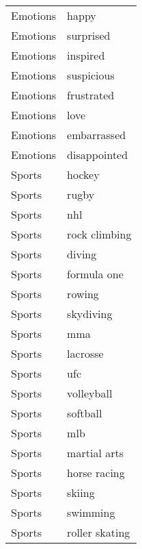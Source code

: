 \begin{supertabular}{l p{0.25\textwidth}}
         Emotions &                              happy \\
         Emotions &                          surprised \\
         Emotions &                           inspired \\
         Emotions &                         suspicious \\
         Emotions &                         frustrated \\
         Emotions &                               love \\
         Emotions &                        embarrassed \\
         Emotions &                       disappointed \\
           Sports &                             hockey \\
           Sports &                              rugby \\
           Sports &                                nhl \\
           Sports &                      rock climbing \\
           Sports &                             diving \\
           Sports &                        formula one \\
           Sports &                             rowing \\
           Sports &                          skydiving \\
           Sports &                                mma \\
           Sports &                           lacrosse \\
           Sports &                                ufc \\
           Sports &                         volleyball \\
           Sports &                           softball \\
           Sports &                                mlb \\
           Sports &                       martial arts \\
           Sports &                       horse racing \\
           Sports &                             skiing \\
           Sports &                           swimming \\
           Sports &                     roller skating \\

\end{supertabular}
